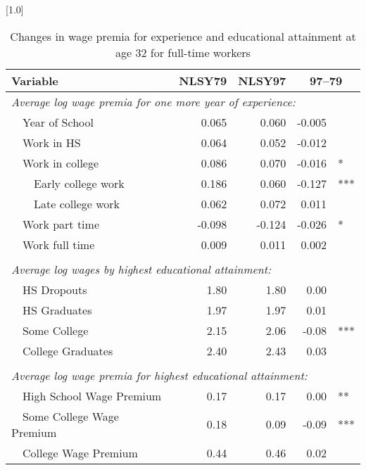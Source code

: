 \begin{table}[ht]
\caption{Changes in wage premia for experience and educational attainment at age 32 for full-time workers}
\label{tab:wagepremia}
\centering
\scalebox{1.0}[1.0]{%
\begin{threeparttable}
\begin{tabular}{lrrr@{}l}
\toprule 
Variable & NLSY79 & NLSY97 & \multicolumn{2}{c}{97--79} \\
\midrule 
\multicolumn{5}{l}{\emph{Average log wage premia for one more year of experience:}} \\
~~Year of School    & 0.065 & 0.060 & -0.005 &     \\ 
~~Work in HS        & 0.064 & 0.052 & -0.012 &       \\ 
~~Work in college   & 0.086 & 0.070 & -0.016 & * \\ 
~~~~Early college work & 0.186 & 0.060 & -0.127 & *** \\ 
~~~~Late college work  & 0.062 & 0.072 & 0.011 &   \\ 
~~Work part time    & -0.098 & -0.124 & -0.026 &  * \\ 
~~Work full time    & 0.009 & 0.011 & 0.002 &    \\ 
\vspace{-6pt}  \\
\multicolumn{5}{l}{\emph{Average log wages by highest educational attainment:}} \\
~~HS Dropouts        & 1.80 & 1.80 & 0.00 &    \\ 
~~HS Graduates       & 1.97 & 1.97 & 0.01 &    \\ 
~~Some College       & 2.15 & 2.06 & -0.08 &  *** \\ 
~~College Graduates  & 2.40 & 2.43 & 0.03 &    \\ 
\vspace{-6pt}  \\
\multicolumn{5}{l}{\emph{Average log wage premia for highest educational attainment:}} \\
~~High School Wage Premium   & 0.17 & 0.17 & 0.00 &  ** \\ 
~~Some College Wage Premium  & 0.18 & 0.09 & -0.09 &  *** \\ 
~~College Wage Premium       & 0.44 & 0.46 & 0.02 &     \\ 
\bottomrule 
\end{tabular} 

\end{threeparttable}}
\end{table}
